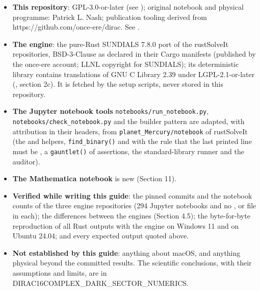 \documentclass[11pt]{article}
\begin{document}
\begin{itemize}
\item \textbf{This repository}: GPL-3.0-or-later (see \texttt{}); original notebook and physical programme: Patrick L. Nash; publication tooling derived from https://github.com/once-ere/dirac. See \texttt{}.
\item \textbf{The engine}: the pure-Rust SUNDIALS 7.8.0 port of the rustSolveIt repositories, BSD-3-Clause as declared in their Cargo manifests (published by the once-ere account; LLNL copyright for SUNDIALS); its deterministic library contains translations of GNU C Library 2.39 under LGPL-2.1-or-later (\texttt{}, section 2c). It is fetched by the setup scripts, never stored in this repository.
\item \textbf{The Jupyter notebook tools} \texttt{notebook\allowbreak{}s/run\_no\allowbreak{}tebook.p\allowbreak{}y}, \texttt{notebook\allowbreak{}s/check\_\allowbreak{}notebook\allowbreak{}.py} and the builder pattern are adapted, with attribution in their headers, from \texttt{planet\_M\allowbreak{}ercury/n\allowbreak{}otebook} of rustSolveIt (the \texttt{} and \texttt{} helpers, \texttt{find\_bin\allowbreak{}ary()} and \texttt{} with the rule that the last printed line must be \texttt{}, a \texttt{gauntlet\allowbreak{}()} of assertions, the standard-library runner and the auditor).
\item \textbf{The Mathematica notebook} is new (Section 11).
\item \textbf{Verified while writing this guide}: the pinned commits and the notebook counts of the three engine repositories (294 Jupyter notebooks and no \texttt{}, \texttt{} or \texttt{} file in each); the differences between the engines (Section 4.5); the byte-for-byte reproduction of all Rust outputs with the \texttt{} engine on Windows 11 and on Ubuntu 24.04; and every expected output quoted above.
\item \textbf{Not established by this guide}: anything about macOS, and anything physical beyond the committed results. The scientific conclusions, with their assumptions and limits, are in DIRAC16COMPLEX\_DARK\_SECTOR\_NUMERICS.
\end{itemize}
\end{document}
